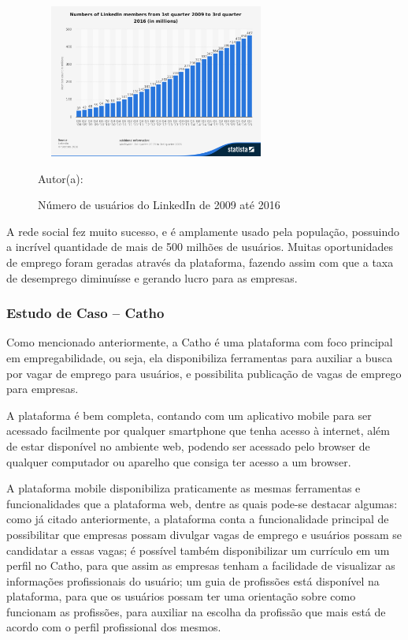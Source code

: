 \begin{figure}[!h]
	\centering
	\caption{Número de usuários do LinkedIn de 2009 até 2016 }
	\includegraphics[width=300px, height=190px]{./images/linkedinMobile2.png}
	\par {Autor(a): \cite{linkedin-c}}
\end{figure}

A rede social fez muito sucesso, e é amplamente usado pela população, possuindo a incrível quantidade de mais de 500 milhões de usuários. Muitas oportunidades de emprego foram geradas através da plataforma, fazendo assim com que a taxa de desemprego diminuísse e gerando lucro para as empresas.


\subsubsection{Estudo de Caso – Catho}

Como mencionado anteriormente, a Catho é uma plataforma com foco principal em empregabilidade, ou seja, ela disponibiliza ferramentas para auxiliar a busca por vagar de emprego para usuários, e possibilita publicação de vagas de emprego para empresas.

A plataforma é bem completa, contando com um aplicativo mobile para ser acessado facilmente por qualquer smartphone que tenha acesso à internet, além de estar disponível no ambiente web, podendo ser acessado pelo browser de qualquer computador ou aparelho que consiga ter acesso a um browser.

A plataforma mobile disponibiliza praticamente as mesmas ferramentas e funcionalidades que a plataforma web, dentre as quais pode-se destacar algumas: como já citado anteriormente, a plataforma conta a funcionalidade principal de possibilitar que empresas possam divulgar vagas de emprego e usuários possam se candidatar a essas vagas; é possível também disponibilizar um currículo em um perfil no Catho, para que assim as empresas tenham a facilidade de visualizar as informações profissionais do usuário; um guia de profissões está disponível na plataforma, para que os usuários possam ter uma orientação sobre como funcionam as profissões, para auxiliar na escolha da profissão que mais está de acordo com o perfil profissional dos mesmos.

